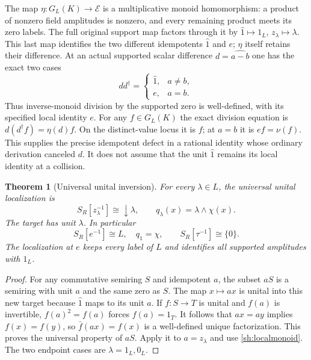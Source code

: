 \documentclass[11pt,a4paper]{article}
\newtheorem{theorem}{Theorem}[section]
\theoremstyle{definition}\newtheorem{definition}[theorem]{Definition}
\begin{document}
The map $\eta:G_L(K)\to\mathcal E$ is a multiplicative
monoid homomorphism: a product of nonzero field amplitudes
is nonzero, and every remaining product meets its zero labels.
The full original support map factors through it by
$\widehat1\mapsto1_L$, $z_\lambda\mapsto\lambda$.
This last map identifies the two different idempotents
$\widehat1$ and $e$; $\eta$ itself retains their difference.
At an actual supported scalar difference $d=\widehat{a-b}$
one has the exact two cases
\begin{equation}\tag{SH6c}\label{sh:collisionunit}
 dd^\dagger=
 \begin{cases}
 \widehat1,&a\ne b,\\
 e,&a=b.
 \end{cases}
\end{equation}
Thus inverse-monoid division by the supported zero is
well-defined, with its specified local identity $e$.
For any $f\in G_L(K)$ the exact division equation is
$d(d^\dagger f)=\eta(d)f$. On the distinct-value locus
it is $f$; at $a=b$ it is $ef=\nu(f)$.
This supplies the precise idempotent defect in a rational
identity whose ordinary derivation canceled $d$. It does
not assume that the unit $\widehat1$ remains its local
identity at a collision.

\begin{theorem}[Universal unital inversion]\label{sh:localization}
For every $\lambda\in L$, the universal unital localization is
\begin{equation}\tag{SH7}\label{sh:localize}
 S_R[z_\lambda^{-1}]\cong\downarrow\lambda,\qquad
 q_\lambda(x)=\lambda\wedge\chi(x).
\end{equation}
The target has unit $\lambda$. In particular
\begin{equation}\tag{SH8}\label{sh:elocalize}
 S_R[e^{-1}]\cong L,\quad q_1=\chi,\qquad
 S_R[\tau^{-1}]\cong\{0\}.
\end{equation}
The localization at $e$ keeps every label of $L$ and identifies
all supported amplitudes with $1_L$.
\end{theorem}
\begin{proof}
For any commutative semiring $S$ and idempotent $a$, the subset
$aS$ is a semiring with unit $a$ and the same zero as $S$.
The map $x\mapsto ax$ is unital into this new target because
$\widehat1$ maps to its unit $a$. If $f:S\to T$ is unital and
$f(a)$ is invertible, $f(a)^2=f(a)$ forces $f(a)=1_T$.
It follows that $ax=ay$ implies $f(x)=f(y)$, so
$\bar f(ax)=f(x)$ is a well-defined unique factorization.
This proves the universal property of $aS$.
Apply it to $a=z_\lambda$ and use \eqref{sh:localmonoid}.
The two endpoint cases are $\lambda=1_L,0_L$.
\end{proof}
\end{document}
